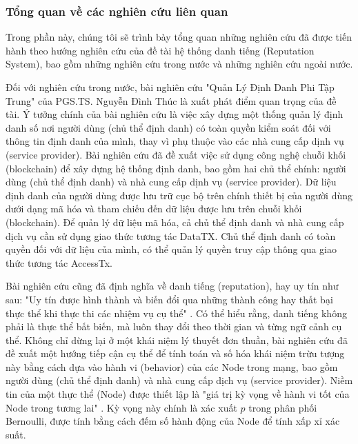 \documentclass{article}[14pt]
\begin{document}
{        \subsubsection{Tổng quan về các nghiên cứu liên quan} 
            Trong phần này, chúng tôi sẽ trình bày tổng quan những nghiên cứu đã được tiến hành theo hướng nghiên cứu của đề tài hệ thống danh tiếng (Reputation System), bao gồm những nghiên cứu trong nước và những nghiên cứu ngoài nước. 
            \par
            Đối với nghiên cứu trong nước, bài nghiên cứu "Quản Lý Định Danh Phi Tập Trung" của PGS.TS. Nguyễn Đình Thúc \cite{quan-ly-dinh-danh-phi-tap-trung} là xuất phát điểm quan trọng của đề tài. Ý tưởng chính của bài nghiên cứu là việc xây dựng một thống quản lý định danh số nơi người dùng (chủ thể định danh) có toàn quyền kiểm soát đối với thông tin định danh của mình, thay vì phụ thuộc vào các nhà cung cấp dịnh vụ (service provider). Bài nghiên cứu đã đề xuất việc sử dụng công nghệ chuỗi khối (blockchain) để xây dựng hệ thống định danh, bao gồm hai chủ thể chính: người dùng (chủ thể định danh) và nhà cung cấp dịnh vụ (service provider). Dữ liệu định danh của người dùng được lưu trữ cục bộ trên chính thiết bị của người dùng dưới dạng mã hóa và tham chiếu đến dữ liệu được lưu trên chuỗi khối (blockchain). Để quản lý dữ liệu mã hóa, cả chủ thể định danh và nhà cung cấp dịch vụ cần sử dụng giao thức tương tác DataTX. Chủ thể định danh có toàn quyền đối với dữ liệu của mình, có thể quản lý quyền truy cập thông qua giao thức tương tác AccessTx. 
            \par
            Bài nghiên cứu cũng đã định nghĩa về danh tiếng (reputation), hay uy tín như sau: "Uy tín được hình thành và biến đổi qua những thành công hay thất bại thực thể khi thực thi các nhiệm vụ cụ thể" \cite{quan-ly-dinh-danh-phi-tap-trung,a-survey-of-trust-in-internet-applications}. Có thể hiểu rằng, danh tiếng không phải là thực thể bất biến, mà luôn thay đổi theo thời gian và từng ngữ cảnh cụ thể. Không chỉ dừng lại ở một khái niệm lý thuyết đơn thuần, bài nghiên cứu đã đề xuất một hướng tiếp cận cụ thể để tính toán và số hóa khái niệm trừu tượng này bằng cách dựa vào hành vi (behavior) của các Node trong mạng, bao gồm người dùng (chủ thể định danh) và nhà cung cấp dịch vụ (service provider). Niềm tin của một thực thể (Node) được thiết lập là "giá trị kỳ vọng về hành vi tốt của Node trong tương lai" \cite{quan-ly-dinh-danh-phi-tap-trung}. Kỳ vọng này chính là xác xuất \(p\) trong phân phối Bernoulli, được tính bằng cách đếm số hành động của Node để tính xấp xỉ xác suất. \cite{thong-ke-may-tinh,quan-ly-dinh-danh-phi-tap-trung} 
}
\end{document}
